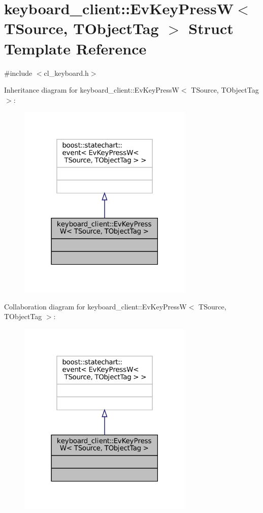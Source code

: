 \hypertarget{structkeyboard__client_1_1EvKeyPressW}{}\section{keyboard\+\_\+client\+:\+:Ev\+Key\+PressW$<$ T\+Source, T\+Object\+Tag $>$ Struct Template Reference}
\label{structkeyboard__client_1_1EvKeyPressW}


{\ttfamily \#include $<$cl\+\_\+keyboard.\+h$>$}



Inheritance diagram for keyboard\+\_\+client\+:\+:Ev\+Key\+PressW$<$ T\+Source, T\+Object\+Tag $>$\+:
\nopagebreak
\begin{figure}[H]
\begin{center}
\leavevmode
\includegraphics[width=237pt]{structkeyboard__client_1_1EvKeyPressW__inherit__graph}
\end{center}
\end{figure}


Collaboration diagram for keyboard\+\_\+client\+:\+:Ev\+Key\+PressW$<$ T\+Source, T\+Object\+Tag $>$\+:
\nopagebreak
\begin{figure}[H]
\begin{center}
\leavevmode
\includegraphics[width=237pt]{structkeyboard__client_1_1EvKeyPressW__coll__graph}
\end{center}
\end{figure}


